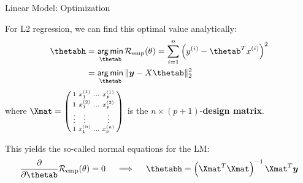 \documentclass[11pt,compress,t,notes=noshow, xcolor=table]{beamer}
\newenvironment{knitrout}{}{} %
\begin{document}
\begin{vbframe}{Linear Model: Optimization}
\begin{knitrout}
{}



\end{knitrout}


\framebreak

For L2 regression, we can find this optimal value analytically:
\begin{align*}
\thetabh &= \argmin_{\thetab} \risket = \sumin \left(\yi - \thetab^T \xi\right)^2\\
             &=\argmin_{\thetab} \|\yv - X\thetab\|^2_2\
\end{align*}
where $\Xmat = \left(\begin{smallmatrix}1 & x^{(1)}_1 & \ldots & x^{(1)}_p \\
                              1 & x^{(2)}_1 & \ldots & x^{(2)}_p \\
                              \vdots & \vdots & & \vdots \\
                              1 & x^{(n)}_1 & \ldots & x^{(n)}_p \end{smallmatrix}\right)$
is the $n \times (p+1)$-\textbf{design matrix}.

\lz

This yields the so-called normal equations for the LM:
\[
\frac{\partial}{\partial\thetab} \risket = 0 \quad\implies\quad \thetabh = \left(\Xmat^T \Xmat\right)^{-1}\Xmat^T\yv
\]

\end{vbframe}
\end{document}
